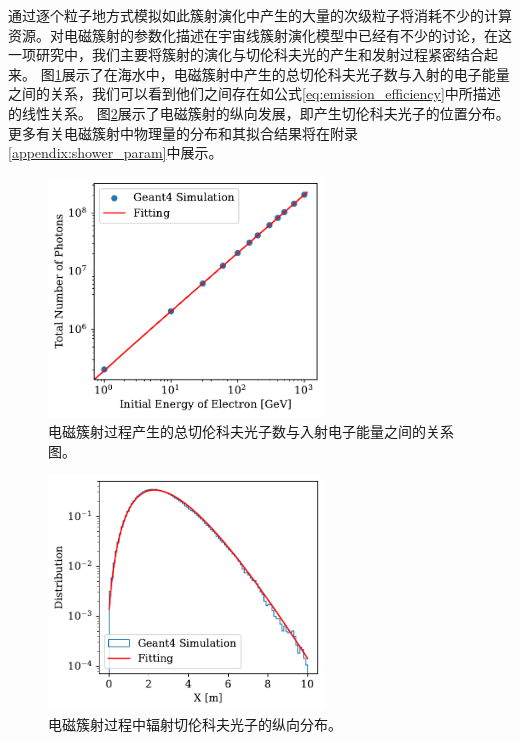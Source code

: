通过逐个粒子地方式模拟如此簇射演化中产生的大量的次级粒子将消耗不少的计算资源。对电磁簇射的参数化描述在宇宙线簇射演化模型中已经有不少的讨论\cite{Matthews:2005, Montanus:2011, Stadelmaier:2023}，在这一项研究中，我们主要将簇射的演化与切伦科夫光的产生和发射过程紧密结合起来。
图\ref{fig:param_num_photon_vs_energy}展示了在海水中，电磁簇射中产生的总切伦科夫光子数与入射的电子能量之间的关系，我们可以看到他们之间存在如公式\ref{eq:emission_efficiency}中所描述的线性关系。
图\ref{fig:param_X_distribution}展示了电磁簇射的纵向发展，即产生切伦科夫光子的位置分布。
更多有关电磁簇射中物理量的分布和其拟合结果将在附录\ref{appendix:shower_param}中展示。

\begin{figure}[!ht]
\centering
    \includegraphics[width=0.65\textwidth]{img/param_num_photon_vs_energy.pdf}
    \caption{电磁簇射过程产生的总切伦科夫光子数与入射电子能量之间的关系图。}
    \label{fig:param_num_photon_vs_energy}
\end{figure}

\begin{figure}[!ht]
\centering
    \includegraphics[width=0.65\textwidth]{img/param_X_distribution.pdf}
    \caption{电磁簇射过程中辐射切伦科夫光子的纵向分布。}
    \label{fig:param_X_distribution}
\end{figure}





